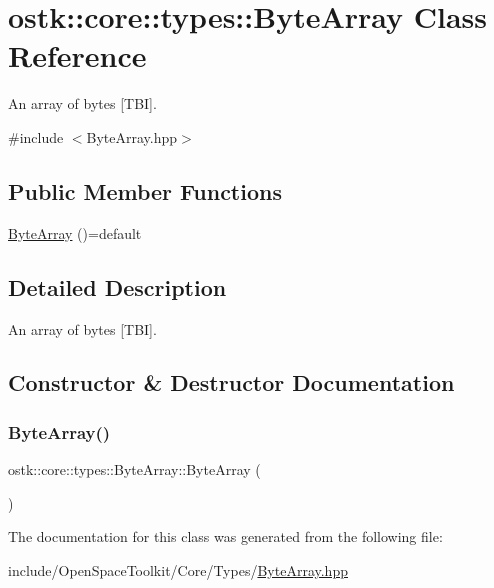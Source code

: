 \hypertarget{classostk_1_1core_1_1types_1_1_byte_array}{}\section{ostk\+:\+:core\+:\+:types\+:\+:Byte\+Array Class Reference}
\label{classostk_1_1core_1_1types_1_1_byte_array}


An array of bytes \mbox{[}T\+BI\mbox{]}.  




{\ttfamily \#include $<$Byte\+Array.\+hpp$>$}

\subsection*{Public Member Functions}
\begin{DoxyCompactItemize}
\item 
\hyperlink{classostk_1_1core_1_1types_1_1_byte_array_a21b54a211f7982cab36147ec59d2b05d}{Byte\+Array} ()=default
\end{DoxyCompactItemize}


\subsection{Detailed Description}
An array of bytes \mbox{[}T\+BI\mbox{]}. 

\subsection{Constructor \& Destructor Documentation}
\mbox{\label{classostk_1_1core_1_1types_1_1_byte_array_a21b54a211f7982cab36147ec59d2b05d}} 
\subsubsection{\texorpdfstring{Byte\+Array()}{ByteArray()}}
{\footnotesize\ttfamily ostk\+::core\+::types\+::\+Byte\+Array\+::\+Byte\+Array (\begin{DoxyParamCaption}{ }\end{DoxyParamCaption})\hspace{0.3cm}{\ttfamily [default]}}



The documentation for this class was generated from the following file\+:\begin{DoxyCompactItemize}
\item 
include/\+Open\+Space\+Toolkit/\+Core/\+Types/\hyperlink{_byte_array_8hpp}{Byte\+Array.\+hpp}\end{DoxyCompactItemize}
